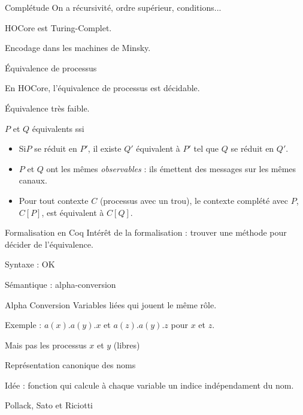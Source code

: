 \documentclass{beamer}
\begin{document}
\begin{frame}{Complétude}
On a récursivité, ordre supérieur, conditions...

HOCore est Turing-Complet.

Encodage dans les machines de Minsky.
\end{frame}
 
\begin{frame}{Équivalence de processus}
\begin{center}
En HOCore, l'équivalence de processus est décidable.
\end{center}
Équivalence très faible. 

$P$ et $Q$ équivalents ssi \begin{itemize}
\item Si$P$ se réduit en $P'$, il existe $Q'$ équivalent à $P'$ tel que $Q$ se réduit en $Q'$. 
\item $P$ et $Q$ ont les mêmes \textit{observables} : ils émettent des messages sur les mêmes canaux.  
\item Pour tout contexte $C$ (processus avec un trou), le contexte complété avec $P$, $C[P]$, est équivalent à $C[Q]$.
\end{itemize}
\end{frame}

\begin{frame}{Formalisation en Coq}
Intérêt de la formalisation : trouver une méthode pour décider de l'équivalence.

Syntaxe : OK

Sémantique : alpha-conversion

\begin{exampleblock}{Alpha Conversion}
Variables liées qui jouent le même rôle.

Exemple : $a(x).a(y).x$ et $a(z).a(y).z$ pour $x$ et $z$.

Mais pas les processus $x$ et $y$ (libres)
\end{exampleblock}
\end{frame}

\begin{frame}{Représentation canonique des noms}

Idée : fonction qui calcule à chaque variable un indice indépendament du nom.

Pollack, Sato et Riciotti 

\end{frame}
\end{document}
